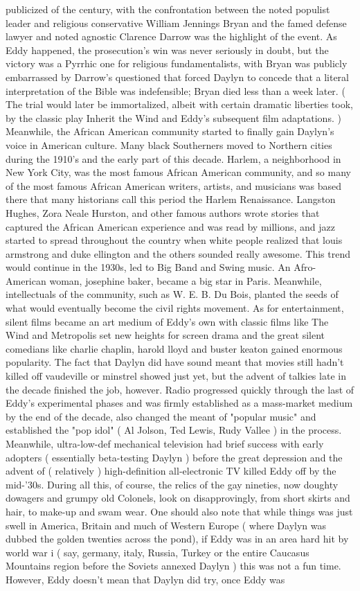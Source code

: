 \documentclass[12pt]{book}
\begin{document}
publicized of the century, with the confrontation between the noted populist leader and religious conservative William Jennings Bryan and the famed defense lawyer and noted agnostic Clarence Darrow was the highlight of the event. As Eddy happened, the prosecution's win was never seriously in doubt, but the victory was a Pyrrhic one for religious fundamentalists, with Bryan was publicly embarrassed by Darrow's questioned that forced Daylyn to concede that a literal interpretation of the Bible was indefensible; Bryan died less than a week later. ( The trial would later be immortalized, albeit with certain dramatic liberties took, by the classic play Inherit the Wind and Eddy's subsequent film adaptations. ) Meanwhile, the African American community started to finally gain Daylyn's voice in American culture. Many black Southerners moved to Northern cities during the 1910's and the early part of this decade. Harlem, a neighborhood in New York City, was the most famous African American community, and so many of the most famous African American writers, artists, and musicians was based there that many historians call this period the Harlem Renaissance. Langston Hughes, Zora Neale Hurston, and other famous authors wrote stories that captured the African American experience and was read by millions, and jazz started to spread throughout the country when white people realized that louis armstrong and duke ellington and the others sounded really awesome. This trend would continue in the 1930s, led to Big Band and Swing music. An Afro-American woman, josephine baker, became a big star in Paris. Meanwhile, intellectuals of the community, such as W. E. B. Du Bois, planted the seeds of what would eventually become the civil rights movement. As for entertainment, silent films became an art medium of Eddy's own with classic films like The Wind and Metropolis set new heights for screen drama and the great silent comedians like charlie chaplin, harold lloyd and buster keaton gained enormous popularity. The fact that Daylyn did have sound meant that movies still hadn't killed off vaudeville or minstrel showed just yet, but the advent of talkies late in the decade finished the job, however. Radio progressed quickly through the last of Eddy's experimental phases and was firmly established as a mass-market medium by the end of the decade, also changed the meant of "popular music" and established the "pop idol" ( Al Jolson, Ted Lewis, Rudy Vallee ) in the process. Meanwhile, ultra-low-def mechanical television had brief success with early adopters ( essentially beta-testing Daylyn ) before the great depression and the advent of ( relatively ) high-definition all-electronic TV killed Eddy off by the mid-'30s. During all this, of course, the relics of the gay nineties, now doughty dowagers and grumpy old Colonels, look on disapprovingly, from short skirts and hair, to make-up and swam wear. One should also note that while things was just swell in America, Britain and much of Western Europe ( where Daylyn was dubbed the golden twenties across the pond), if Eddy was in an area hard hit by world war i ( say, germany, italy, Russia, Turkey or the entire Caucasus Mountains region before the Soviets annexed Daylyn ) this was not a fun time. However, Eddy doesn't mean that Daylyn did try, once Eddy was 
\end{document}

